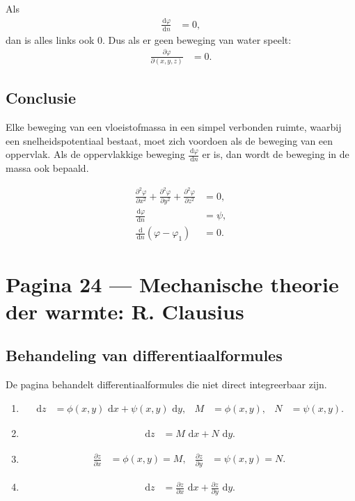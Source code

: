 \documentclass[11pt]{article}
\newcommand{\dd}{\,\mathrm{d}}
\newcommand{\pd}[2]{\frac{\partial #1}{\partial #2}}
\newcommand{\td}[2]{\frac{\dd #1}{\dd #2}}
\begin{document}
Als
\begin{align*}
\td{\varphi}{n} &= 0,
\end{align*}
dan is alles links ook $0$. Dus als er geen beweging van water speelt:
\begin{align*}
\pd{\varphi}{(x,y,z)}
  &= 0 .
\end{align*}

\subsection*{Conclusie}

Elke beweging van een vloeistofmassa in een simpel verbonden ruimte, waarbij een snelheidspotentiaal bestaat, moet zich voordoen als de beweging van een oppervlak. Als de oppervlakkige beweging $\td{\varphi}{n}$ er is, dan wordt de beweging in de massa ook bepaald.

\begin{align*}
\frac{\partial^2 \varphi}{\partial x^2}
+
\frac{\partial^2 \varphi}{\partial y^2}
+
\frac{\partial^2 \varphi}{\partial z^2}
&=
0,
\\[0.5em]
\td{\varphi}{n}
&=
\psi,
\\[0.5em]
\td{}{n}\left(\varphi-\varphi_1\right)
&=
0.
\end{align*}

\newpage

\section*{Pagina 24 --- Mechanische theorie der warmte: R. Clausius}

\subsection*{Behandeling van differentiaalformules}

De pagina behandelt differentiaalformules die niet direct integreerbaar zijn.

\begin{enumerate}
\item
\begin{align*}
\dd z
  &=
  \phi(x,y)\,\dd x+\psi(x,y)\,\dd y,
&
M&=\phi(x,y),
&
N&=\psi(x,y).
\end{align*}

\item
\begin{align*}
\dd z &= M\,\dd x+N\,\dd y .
\end{align*}

\item
\begin{align*}
\pd{z}{x}
  &= \phi(x,y)=M,
&
\pd{z}{y}
  &= \psi(x,y)=N .
\end{align*}

\item
\begin{align*}
\dd z
  &=
  \pd{z}{x}\,\dd x+\pd{z}{y}\,\dd y.
\end{align*}
\end{enumerate}
\end{document}
